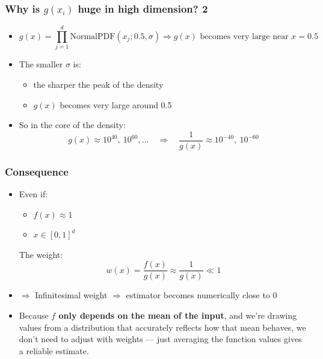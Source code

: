 \documentclass[aspectratio=169,xcolor=dvipsnames]{beamer}
\begin{document}
    \begin{frame}
        \frametitle{Why is $g(x_i)$ huge in high dimension? 2}
    
        \vspace{-1em}
        
        \begin{itemize}
            \item<1->\[
        g(x) = \prod_{j=1}^d \text{NormalPDF}(x_j ; 0.5, \sigma)
        \Rightarrow g(x) \text{ becomes very large near } x = 0.5
        \]
        
        \item<2->The smaller $\sigma$ is:
          \begin{itemize}
            \item the sharper the peak of the density
            \item $g(x)$ becomes very large around 0.5
          \end{itemize}
        
        \bigskip
        
        \item<3->So in the core of the density:
        \[
        g(x) \approx 10^{40},\ 10^{60},\dots \quad \Rightarrow \quad \frac{1}{g(x)} \approx 10^{-40},\ 10^{-60}
        \]
        \end{itemize}
    
    \end{frame}

    \begin{frame}
        \frametitle{Consequence}
        
        \begin{itemize}
            \item<1-> Even if:
            \begin{itemize}
              \item $f(x) \approx 1$
              \item $x \in [0,1]^d$
            \end{itemize}
        
            The weight:
            \[
            w(x) = \frac{f(x)}{g(x)} \approx \frac{1}{g(x)} \ll 1
            \]
        
            \vspace{1em}
                \item<2->$\Rightarrow$ Infinitesimal weight $\Rightarrow$ estimator becomes numerically close to 0
            
            \vspace{1em}
        
            \item<3->Because \textbf{$f$ only depends on the mean of the input}, and we're drawing values from a distribution that accurately reflects how that mean behaves, we don’t need to adjust with weights — just averaging the function values gives a reliable estimate.
        \end{itemize}
    \end{frame}
\end{document}
